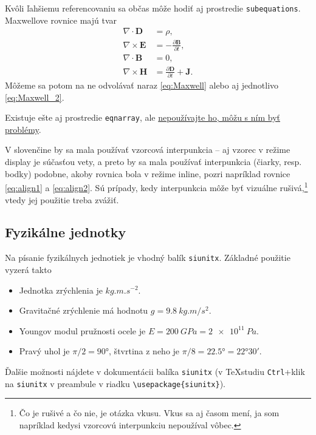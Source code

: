 Kvôli ľahšiemu referencovaniu sa občas môže hodiť aj prostredie \verb|subequations|. Maxwellove rovnice majú tvar
\begin{subequations}
	\label{eq:Maxwell}
	\begin{align}
		\nabla\cdot\mathbf{D}  & =\rho,    \label{eq:Maxwell_1}                                               \\
		\nabla\times\mathbf{E} & = -\frac{\partial \mathbf{B}}{\partial t},  \label{eq:Maxwell_2}             \\
		\nabla\cdot\mathbf{B}  & =0,    \label{eq:Maxwell_3}                                                  \\
		\nabla\times\mathbf{H} & = \frac{\partial \mathbf{D}}{\partial t} + \mathbf{J}.  \label{eq:Maxwell_4}
	\end{align}
\end{subequations}
Môžeme sa potom na ne odvolávať naraz \eqref{eq:Maxwell} alebo aj jednotlivo \eqref{eq:Maxwell_2}.


\begin{rem}
	Existuje ešte aj prostredie \verb|eqnarray|, ale \href{https://tex.stackexchange.com/questions/196/eqnarray-vs-align}{nepoužívajte ho, môžu s ním byť problémy}.
\end{rem}

\begin{rem}
	V slovenčine by sa mala používať vzorcová interpunkcia -- aj vzorec v režime display je súčasťou vety, a preto by sa mala používať interpunkcia (čiarky, resp. bodky) podobne, akoby rovnica bola v režime inline, pozri napríklad rovnice \eqref{eq:align1} a \eqref{eq:align2}. Sú prípady, kedy interpunkcia môže byť vizuálne rušivá,\footnote{Čo je rušivé a čo nie, je otázka vkusu. Vkus sa aj časom mení, ja som napríklad kedysi vzorcovú interpunkciu nepoužíval vôbec.} vtedy jej použitie treba zvážiť.
\end{rem}



\subsection{Fyzikálne jednotky}
Na písanie fyzikálnych jednotiek je vhodný balík \verb|siunitx|. Základné použitie vyzerá takto
\begin{itemize}
	\item Jednotka zrýchlenia je $\si{kg.m.s^{-2}}$.
	\item Gravitačné zrýchlenie má hodnotu $g=\SI{9,8}{kg.m/s^2}$.
	\item Youngov modul pružnosti ocele je $E=\SI{200}{GPa}=\SI{2e11}{Pa}$.
	\item Pravý uhol je $\pi/2=\ang{90}$, štvrtina z neho je $\pi/8=\ang{22.5}=\ang{22;30;}$.	
\end{itemize}
Ďalšie možnosti nájdete v dokumentácii balíka \verb|siunitx| (v TeXstudiu \verb|Ctrl|+klik na \verb|siunitx| v preambule v riadku \verb|\usepackage{siunitx}|).


